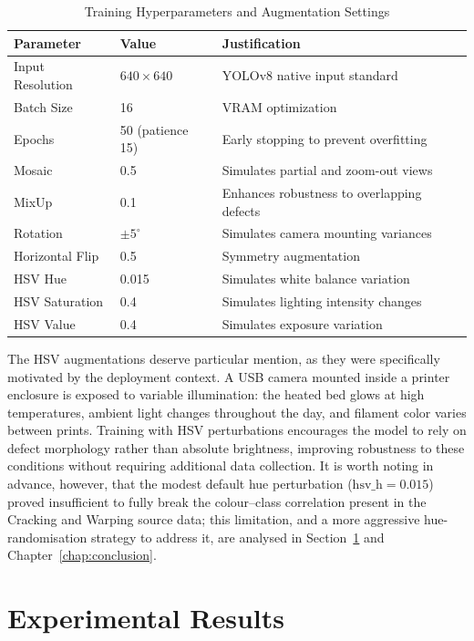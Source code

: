 \documentclass[english, Lau, oneside]{sapthesis}
\begin{document}
\begin{table}[h]
\centering
\caption{Training Hyperparameters and Augmentation Settings}
\label{tab:hyperparams}
\begin{tabular}{|l|l|l|}
\hline
\textbf{Parameter} & \textbf{Value} & \textbf{Justification} \\ \hline
Input Resolution & $640 \times 640$ & YOLOv8 native input standard \\ \hline
Batch Size & 16 & VRAM optimization \\ \hline
Epochs & 50 (patience 15) & Early stopping to prevent overfitting \\ \hline
Mosaic & 0.5 & Simulates partial and zoom-out views \\ \hline
MixUp & 0.1 & Enhances robustness to overlapping defects \\ \hline
Rotation & $\pm 5^{\circ}$ & Simulates camera mounting variances \\ \hline
Horizontal Flip & 0.5 & Symmetry augmentation \\ \hline
HSV Hue & 0.015 & Simulates white balance variation \\ \hline
HSV Saturation & 0.4 & Simulates lighting intensity changes \\ \hline
HSV Value & 0.4 & Simulates exposure variation \\ \hline
\end{tabular}
\end{table}

The HSV augmentations deserve particular mention, as they were specifically motivated by the deployment context. A USB camera mounted inside a printer enclosure is exposed to variable illumination: the heated bed glows at high temperatures, ambient light changes throughout the day, and filament color varies between prints. Training with HSV perturbations encourages the model to rely on defect morphology rather than absolute brightness, improving robustness to these conditions without requiring additional data collection. It is worth noting in advance, however, that the modest default hue perturbation ($\text{hsv\_h}=0.015$) proved insufficient to fully break the colour--class correlation present in the Cracking and Warping source data; this limitation, and a more aggressive hue-randomisation strategy to address it, are analysed in Section~\ref{sec:results} and Chapter~\ref{chap:conclusion}.

\section{Experimental Results}
\label{sec:results}
\end{document}
